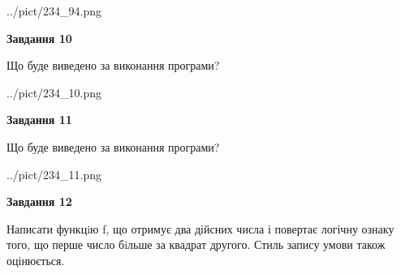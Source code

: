 \documentclass[12pt, ukrainian]{article}
\begin{document}
{\begin {large}
\begin{center}
	{../pict/234_94.png}
\end{center}
\newpage

{\begin {center}\textbf{Завдання 10}\end {center}}

Що буде виведено за виконання програми?\par
\begin{center}
	{../pict/234_10.png}
\end{center}
\newpage

{\begin {center}\textbf{Завдання 11}\end {center}}

Що буде виведено за виконання програми?\par
\begin{center}
	{../pict/234_11.png}
\end{center}
\newpage

{\begin {center}\textbf{Завдання 12}\end {center}}


Написати функцiю f, що отримує два дійсних числа і повертає логічну ознаку того, що перше число бiльше за квадрат другого. Стиль запису умови також оцінюється.\par
\newpage

\end {large}}
\end{document}

